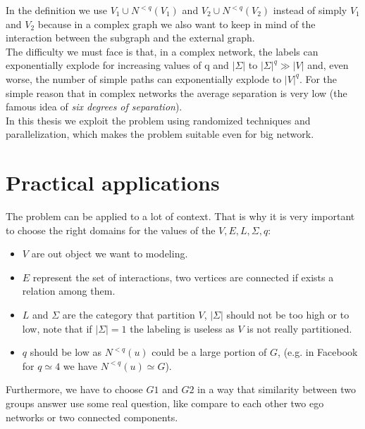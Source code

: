 In the definition we use $V_{1} \cup N^{<q}(V_{1})$ and $V_{2} \cup N^{<q}(V_{2})$ instead of simply $V_{1}$ and $V_{2}$ because in a complex graph we also want to keep in mind of the interaction between the subgraph and the external graph.\\

The difficulty we must face is that, in a complex network, the labels can exponentially explode for increasing values of q and $|\Sigma|$ to $|\Sigma|^{q} \gg |V|$ and, even worse, the number of simple paths can exponentially explode to $|V|^{q}$. 
For the simple reason that in complex networks the average separation is very low (the famous idea of \textit{six degrees of separation}).\\

In this thesis we exploit the problem using randomized techniques and parallelization, which makes the problem suitable even for big network. 

\section{Practical applications}

The problem can be applied to a lot of context.
That is why it is very important to choose the right domains for the values of the $V, E, L, \Sigma, q$:
\begin{itemize}
\item $V$ are out object we want to modeling.
\item $E$ represent the set of interactions, two vertices are connected if exists a relation among them.
\item $L$ and $\Sigma$ are the category that partition $V$, $|\Sigma|$ should not be too high or to low, note that if $|\Sigma| = 1$ the labeling is useless as $V$ is not really partitioned.
\item $q$ should be low as $N^{<q}(u)$ could be a large portion of $G$, (e.g. in Facebook for $q \simeq 4$ we have $N^{<q}(u) \simeq G$)\cite{Facebook}.
\end{itemize}

Furthermore, we have to choose $G1$ and $G2$ in a way that similarity between two groups answer use some real question, like compare to each other two ego networks or two connected components.\\

